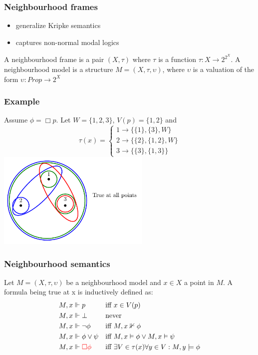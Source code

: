 \documentclass[hyperref={pdfpagelabels=false},t,10pt]{beamer}
\begin{document}
\begin{frame}
  \frametitle{Neighbourhood frames}
    \begin{itemize}
      \item generalize Kripke semantics
      \item captures non-normal modal logics
    \end{itemize}

    \pause
    \begin{definition}
      A neighbourhood frame is a pair $(X, \tau)$ where $\tau$ is a function $\tau : X \rightarrow 2^{2^X}$. \newline
      A neighbourhood model is a structure $M = (X, \tau, \upsilon)$, where $\upsilon$ is a valuation of the form $\upsilon : Prop \rightarrow 2^X$
    \end{definition}
\end{frame}

\begin{frame}
  \frametitle{Example}
      Assume $\phi = \Box p$. Let $W = \{1,2,3\}$, $V(p) = \{1,2\}$ and 
    \[
            \tau(x) = 
            \begin{cases}
                1 \rightarrow \{\{1\}, \{3\}, W\} \\
                2 \rightarrow \{\{2\}, \{1,2\}, W\} \\
                3 \rightarrow \{\{3\}, \{1,3\}\}
            \end{cases}
    \] 
    \centering
      \includegraphics[width=0.55\textwidth]{Example3.pdf}
\end{frame}

\begin{frame}
  \frametitle{Neighbourhood semantics}
  Let $M = (X,\tau,\upsilon)$ be a neighbourhood model and $x \in X$ a point in $M$. A formula being true at x is inductively defined as:
      \begin{align*}
        M,x &\Vdash p &&\text{iff } x \in V(p)\\
        M,x &\Vdash \bot &&\text{never } \\
        M,x &\Vdash \neg \phi &&\text{iff } M,x \nVdash \phi\\
        M,x &\Vdash \phi \lor \psi &&\text{iff } M,x \vDash \phi \lor M,x \vDash \psi\\
        M,x &\Vdash \textcolor{red}{\Box \phi} &&\text{iff } \exists V \in \tau(x) \forall y \in V : M,y \models \phi
    \end{align*}

\end{frame}
\end{document}
